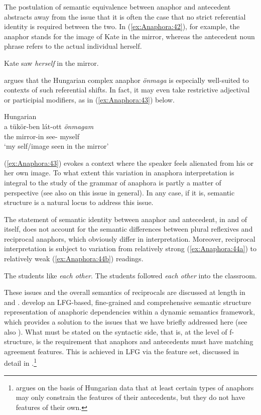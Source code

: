 \documentclass[output=paper,hidelinks]{langscibook}
\begin{document}
The postulation of semantic equivalence between anaphor and antecedent abstracts away from the issue that it is often the case that no strict referential identity is required between the two. In (\ref{ex:Anaphora:42}), for example, the anaphor stands for the image of Kate in the mirror, whereas the antecedent noun phrase refers to the actual individual herself.

\ea\label{ex:Anaphora:42} Kate saw \emph{herself} in the mirror.
\z

\noindent \citet{Rakosi2009} argues that the Hungarian complex anaphor \emph{önmaga} is especially well-suited to contexts of such referential shifts. In fact, it may even take restrictive adjectival or participial modifiers, as in (\ref{ex:Anaphora:43}) below.

\ea\label{ex:Anaphora:43} Hungarian\\
\gll
a  tükör-ben  lát-ott   \textit{önmagam}\\
the mirror-in see- myself\\
\glt `my self/image seen in the mirror'
\z

\noindent (\ref{ex:Anaphora:43}) evokes a context where the speaker feels alienated from his or her own image. To what extent this variation in anaphora interpretation is integral to the study of the grammar of anaphora is partly a matter of perspective (see also \citealt{Jackendoff1992-eq} on this issue in general). In any case, if it is, semantic structure is a natural locus to address this issue.

The statement of semantic identity between anaphor and antecedent, in and of itself, does not account for the semantic differences between plural reflexives and reciprocal anaphors, which obviously differ in interpretation. Moreover, reciprocal interpretation is subject to variation from relatively strong (\ref{ex:Anaphora:44a}) to relatively weak (\ref{ex:Anaphora:44b}) readings.

\ea\label{ex:Anaphora:44}
\ea\label{ex:Anaphora:44a} The students like \emph{each other}.
\ex\label{ex:Anaphora:44b} The students followed \emph{each other} into the classroom.
\z\z

\noindent These issues and the overall semantics of reciprocals are discussed at length in \citet{DKKMP:LP} and \citet{Haug2020-is}. \citet{DalrympleAl17} develop an LFG-based, fine-grained and comprehensive semantic structure representation of anaphoric dependencies within a dynamic semantics framework, which provides a solution to the issues that we have briefly addressed here (see also \citealt{DLM:LFG}). What must be stated on the syntactic side, that is, at the level of f-structure, is the requirement that anaphors and antecedents must have matching agreement features. This is achieved in LFG via the {\NINDEX} feature set, discussed in detail in .\footnote{\citet{Rakosi22} argues on the basis of Hungarian data that at least certain types of anaphors may only constrain the {\NINDEX} features of their antecedents, but they do not have {\NINDEX} features of their own.}
\end{document}
